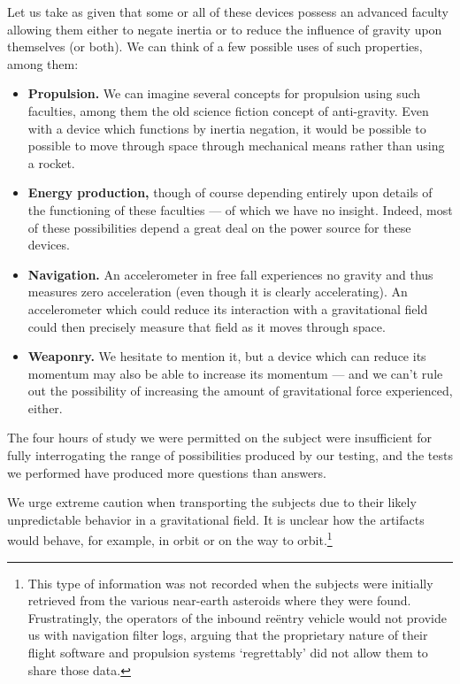\documentclass[10pt]{article}
\theoremstyle{definition}
\begin{document}
Let us take as given that some or all of these devices possess an advanced faculty allowing them either to negate inertia or to reduce the influence of gravity upon themselves (or both).
We can think of a few possible uses of such properties, among them:
\begin{itemize}
\item \textbf{Propulsion.} We can imagine several concepts for propulsion using such faculties, among them the old science fiction concept of anti-gravity. Even with a device which functions by inertia negation, it would be possible to possible to move through space through mechanical means rather than using a rocket.
\item \textbf{Energy production,} though of course depending entirely upon details of the functioning of these faculties --- of which we have no insight. Indeed, most of these possibilities depend a great deal on the power source for these devices.
\item \textbf{Navigation.} An accelerometer in free fall experiences no gravity and thus measures zero acceleration (even though it is clearly accelerating). An accelerometer which could reduce its interaction with a gravitational field could then precisely measure that field as it moves through space.
\item \textbf{Weaponry.} We hesitate to mention it, but a device which can reduce its momentum may also be able to increase its momentum --- and we can't rule out the possibility of increasing the amount of gravitational force experienced, either.
\end{itemize}

 
The four hours of study we were permitted on the subject were insufficient for fully interrogating the range of possibilities produced by our testing, and the tests we performed have produced more questions than answers.

We urge extreme caution when transporting the subjects due to their likely unpredictable behavior in a gravitational field.
It is unclear how the artifacts would behave, for example, in orbit or on the way to orbit.\footnote{This type of information was not recorded when the subjects were initially retrieved from the various near-earth asteroids where they were found. Frustratingly, the operators of the inbound re\"entry vehicle would not provide us with navigation filter logs, arguing that the proprietary nature of their flight software and propulsion systems `regrettably' did not allow them to share those data.}

%
%
\end{document}
